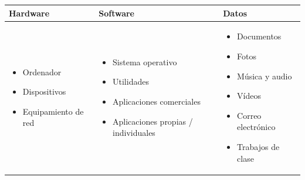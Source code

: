 \documentclass[11pt,a4paper]{report}
\begin{document}
\begin{center}
\small
{\setlength{\aboverulesep}{0pt}\setlength{\belowrulesep}{0pt}\renewcommand{\arraystretch}{1.3}%
\begin{tabularx}{\linewidth}{>{\raggedright\arraybackslash}X !{\color{gray!45}\vrule width 0.2pt} >{\raggedright\arraybackslash}X !{\color{gray!45}\vrule width 0.2pt} >{\raggedright\arraybackslash}X}
\toprule
\centering\textbf{Hardware} & \centering\textbf{Software} & \centering\arraybackslash\textbf{Datos} \\
\midrule
\vspace{-0.5\baselineskip}\begin{itemize}[leftmargin=*,nosep,topsep=0pt]
  \item Ordenador
  \item Dispositivos
  \item Equipamiento de red
\end{itemize}\vspace{2pt}
&
\vspace{-0.5\baselineskip}\begin{itemize}[leftmargin=*,nosep,topsep=0pt]
  \item Sistema operativo
  \item Utilidades
  \item Aplicaciones comerciales
  \item Aplicaciones propias / individuales
\end{itemize}\vspace{2pt}
&
\vspace{-0.5\baselineskip}\begin{itemize}[leftmargin=*,nosep,topsep=0pt]
  \item Documentos
  \item Fotos
  \item Música y audio
  \item Vídeos
  \item Correo electrónico
  \item Trabajos de clase
\end{itemize}\vspace{2pt} \\
\bottomrule
\end{tabularx}}
\end{center}
\end{document}

